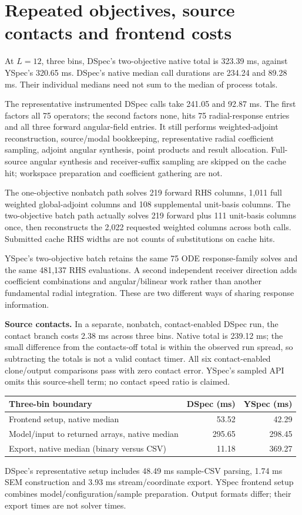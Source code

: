 \clearpage\section{Repeated objectives, source contacts and frontend costs}
At $L=12$, three bins, DSpec's two-objective native total is 323.39 ms, against YSpec's 320.65 ms. DSpec's native median call durations are 234.24 and 89.28 ms. Their individual medians need not sum to the median of process totals.

The representative instrumented DSpec calls take 241.05 and 92.87 ms. The first factors all 75 operators; the second factors none, hits 75 radial-response entries and all three forward angular-field entries. It still performs weighted-adjoint reconstruction, source/modal bookkeeping, representative radial coefficient sampling, adjoint angular synthesis, point products and result allocation. Full-source angular synthesis and receiver-suffix sampling are skipped on the cache hit; workspace preparation and coefficient gathering are not.

The one-objective nonbatch path solves 219 forward RHS columns, 1,011 full weighted global-adjoint columns and 108 supplemental unit-basis columns. The two-objective batch path actually solves 219 forward plus 111 unit-basis columns once, then reconstructs the 2,022 requested weighted columns across both calls. Submitted cache RHS widths are not counts of substitutions on cache hits.

YSpec's two-objective batch retains the same 75 ODE response-family solves and the same 481,137 RHS evaluations. A second independent receiver direction adds coefficient combinations and angular/bilinear work rather than another fundamental radial integration. These are two different ways of sharing response information.

\textbf{Source contacts.} In a separate, nonbatch, contact-enabled DSpec run, the contact branch costs 2.38 ms across three bins. Native total is 239.12 ms; the small difference from the contacts-off total is within the observed run spread, so subtracting the totals is not a valid contact timer. All six contact-enabled clone/output comparisons pass with zero contact error. YSpec's sampled API omits this source-shell term; no contact speed ratio is claimed.

\begin{center}\small\begin{tabular}{p{}rr}\toprule
Three-bin boundary & DSpec (ms) & YSpec (ms)\\\midrule
Frontend setup, native median & 53.52 & 42.29\\
Model/input to returned arrays, native median & 295.65 & 298.45\\
Export, native median (binary versus CSV) & 11.18 & 369.27\\
\bottomrule\end{tabular}\end{center}
DSpec's representative setup includes 48.49 ms sample-CSV parsing, 1.74 ms SEM construction and 3.93 ms stream/coordinate export. YSpec frontend setup combines model/configuration/sample preparation. Output formats differ; their export times are not solver times.


